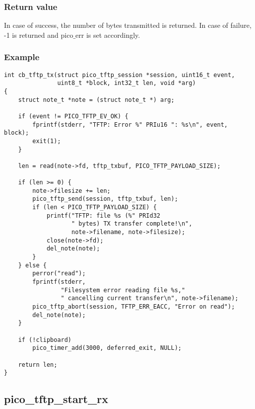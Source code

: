 \subsubsection*{Return value}
In case of success, the number of bytes transmitted is returned. In case of failure, -1 is returned and pico$\_$err is set accordingly.

\subsubsection*{Example}
\begin{verbatim}
int cb_tftp_tx(struct pico_tftp_session *session, uint16_t event,
               uint8_t *block, int32_t len, void *arg)
{
    struct note_t *note = (struct note_t *) arg;

    if (event != PICO_TFTP_EV_OK) {
        fprintf(stderr, "TFTP: Error %" PRIu16 ": %s\n", event, block);
        exit(1);
    }

    len = read(note->fd, tftp_txbuf, PICO_TFTP_PAYLOAD_SIZE);

    if (len >= 0) {
        note->filesize += len;
        pico_tftp_send(session, tftp_txbuf, len);
        if (len < PICO_TFTP_PAYLOAD_SIZE) {
            printf("TFTP: file %s (%" PRId32
                   " bytes) TX transfer complete!\n",
                   note->filename, note->filesize);
            close(note->fd);
            del_note(note);
        }
    } else {
        perror("read");
        fprintf(stderr,
                "Filesystem error reading file %s,"
                " cancelling current transfer\n", note->filename);
        pico_tftp_abort(session, TFTP_ERR_EACC, "Error on read");
        del_note(note);
    }

    if (!clipboard)
        pico_timer_add(3000, deferred_exit, NULL);

    return len;
}
\end{verbatim}


\subsection{pico\_tftp\_start\_rx}

